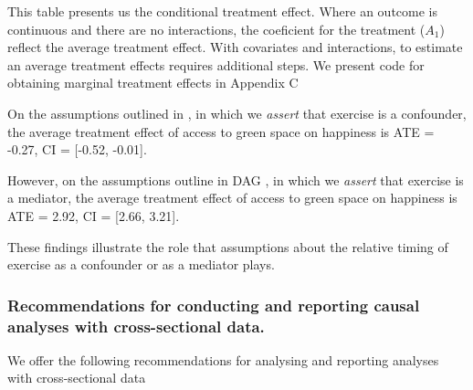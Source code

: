 \documentclass[
  singlecolumn]{article}
\begin{document}
This table presents us the conditional treatment effect. Where an
outcome is continuous and there are no interactions, the coeficient for
the treatment (\(A_1\)) reflect the average treatment effect. With
covariates and interactions, to estimate an average treatment effects
requires additional steps. We present code for obtaining marginal
treatment effects in Appendix C

On the assumptions outlined in , in which we \emph{assert} that exercise
is a confounder, the average treatment effect of access to green space
on happiness is ATE = -0.27, CI = {[}-0.52, -0.01{]}.

However, on the assumptions outline in DAG , in which we \emph{assert}
that exercise is a mediator, the average treatment effect of access to
green space on happiness is ATE = 2.92, CI = {[}2.66, 3.21{]}.

These findings illustrate the role that assumptions about the relative
timing of exercise as a confounder or as a mediator plays.

\subsubsection{Recommendations for conducting and reporting causal
analyses with cross-sectional
data.}\label{recommendations-for-conducting-and-reporting-causal-analyses-with-cross-sectional-data.}

We offer the following recommendations for analysing and reporting
analyses with cross-sectional data
\end{document}
